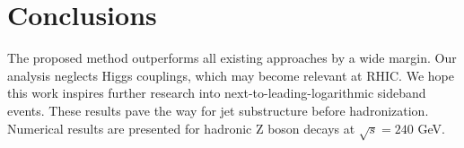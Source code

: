 \section{Conclusions}\label{sec:conclusions}

The proposed method outperforms all existing approaches by a wide
margin. Our analysis neglects Higgs couplings, which may become relevant
at RHIC. We hope this work inspires further research into
next-to-leading-logarithmic sideband events. These results pave the way
for jet substructure before hadronization. Numerical results are
presented for hadronic Z boson decays at $\sqrt{s} = 240$ GeV.

